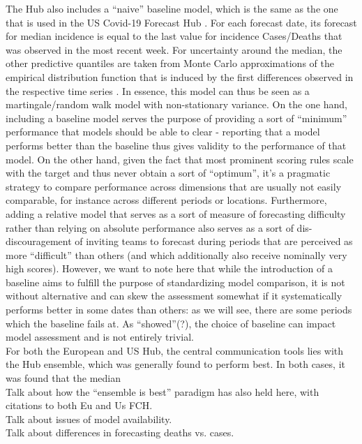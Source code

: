 The Hub also includes a ``naive'' baseline model, which is the same as the one that is used in the US Covid-19 Forecast Hub \cite{cramer_evaluation_2022}. For each forecast date, its forecast for median incidence is equal to the last value for incidence Cases/Deaths that was observed in the most recent week. For uncertainty around the median, the other predictive quantiles are taken from Monte Carlo approximations of the empirical distribution function that is induced by the first differences observed in the respective time series \citep{cramer_evaluation_2022}. In essence, this model can thus be seen as a martingale/random walk model with non-stationary variance. On the one hand, including a baseline model serves the purpose of providing a sort of ``minimum'' performance that models should be able to clear - reporting that a model performs better than the baseline thus gives validity to the performance of that model. On the other hand, given the fact that most prominent scoring rules scale with the target and thus never obtain a sort of ``optimum'', it's a pragmatic strategy to compare performance across dimensions that are usually not easily comparable, for instance across different periods or locations. Furthermore, adding a relative model that serves as a sort of measure of forecasting difficulty rather than relying on absolute performance also serves as a sort of dis-discouragement of inviting teams to forecast during periods that are perceived as more ``difficult'' than others (and which additionally also receive nominally very high scores). However, we want to note here that while the introduction of a baseline aims to fulfill the purpose of standardizing model comparison, it is not without alternative and can skew the assessment somewhat if it systematically performs better in some dates than others: as we will see, there are some periods which the baseline fails at. As \cite{bracher_evaluating_2021} ``showed''(?), the choice of baseline can impact model assessment and is not entirely trivial.\\
For both the European and US Hub, the central communication tools lies with the Hub ensemble, which was generally found to perform best. In both cases, it was found that the median  \\
Talk about how the ``ensemble is best'' paradigm has also held here, with citations to both Eu and Us FCH.\\
Talk about issues of model availability.\\
Talk about differences in forecasting deaths vs. cases.\\
